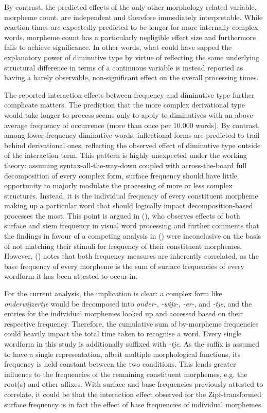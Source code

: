 By contrast, the predicted effects of the only other morphology-related variable, morpheme count, are independent and therefore immediately interpretable. While reaction times are expectedly predicted to be longer for more internally complex words, morpheme count has a particularly negligible effect size and furthermore fails to achieve significance. In other words, what could have sapped the explanatory power of diminutive type by virtue of reflecting the same underlying structural difference in terms of a continuous variable is instead reported as having a barely observable, non-significant effect on the overall processing times.

The reported interaction effects between frequency and diminutive type further complicate matters. The prediction that the more complex derivational type would take longer to process seems only to apply to diminutives with an above-average frequency of occurrence (more than once per 10.000 words). By contrast, among lower-frequency diminutive words, inflectional forms are predicted to trail behind derivational ones, reflecting the observed effect of diminutive type outside of the interaction term. This pattern is highly unexpected under the working theory: assuming syntax-all-the-way-down coupled with across-the-board full decomposition of every complex form, surface frequency should have little opportunity to majorly modulate the processing of more or less complex structures. Instead, it is the individual frequency of every constituent morpheme making up a particular word that should logically impact decomposition-based processes the most. This point is argued in \citeauthor{Taft+1979} (\citeyear{Taft+1979}), who observes effects of both surface and stem frequency in visual word processing and further comments that the findings in favour of a competing analysis in \citeauthor{Manelis+Tharp+1977} (\citeyear{Manelis+Tharp+1977}) were inconclusive on the basis of \citeauthor{Manelis+Tharp+1977} not matching their stimuli for frequency of their constituent morphemes. However, \citeauthor{Taft+1979} (\citeyear{Taft+1979}) notes that both frequency measures are inherently correlated, as the base frequency of every morpheme is the sum of surface frequencies of every wordform it has been attested to occur in.

For the current analysis, the implication is clear: a complex form like \textit{onderwijzertje} would be decomposed into \textit{onder-}, \textit{-wijz-}, \textit{-er-}, and \textit{-tje}, and the entries for the individual morphemes looked up and accessed based on their respective frequency. Therefore, the cumulative sum of by-morpheme frequencies could heavily impact the total time taken to recognise a word. Every single wordform in this study is additionally suffixed with \textit{-tje}. As the suffix is assumed to have a single representation, albeit multiple morphological functions, its frequency is held constant between the two conditions. This lends greater influence to the frequencies of the remaining constituent morphemes, e.g. the root(s) and other affixes. With surface and base frequencies previously attested to correlate, it could be that the interaction effect observed for the Zipf-transformed surface frequency is in fact the effect of base frequencies of individual morphemes.

